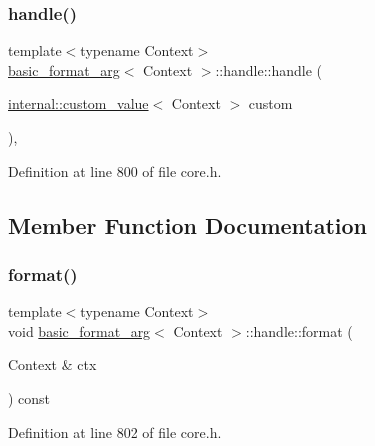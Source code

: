 \subsubsection{\texorpdfstring{handle()}{handle()}}
{\footnotesize\ttfamily template$<$typename Context$>$ \\
\hyperlink{classbasic__format__arg}{basic\+\_\+format\+\_\+arg}$<$ Context $>$\+::handle\+::handle (\begin{DoxyParamCaption}\item[{\hyperlink{structinternal_1_1custom__value}{internal\+::custom\+\_\+value}$<$ Context $>$}]{custom }\end{DoxyParamCaption})\hspace{0.3cm}{\ttfamily [inline]}, {\ttfamily [explicit]}}



Definition at line 800 of file core.\+h.



\subsection{Member Function Documentation}
\mbox{\label{classbasic__format__arg_1_1handle_a3ab20a0f53159f281076487aad60e146}} 
\subsubsection{\texorpdfstring{format()}{format()}}
{\footnotesize\ttfamily template$<$typename Context$>$ \\
void \hyperlink{classbasic__format__arg}{basic\+\_\+format\+\_\+arg}$<$ Context $>$\+::handle\+::format (\begin{DoxyParamCaption}\item[{Context \&}]{ctx }\end{DoxyParamCaption}) const\hspace{0.3cm}{\ttfamily [inline]}}



Definition at line 802 of file core.\+h.

